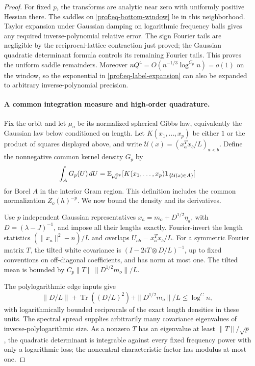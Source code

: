 \begin{proof}
For fixed \(p\), the transforms are analytic near zero with uniformly
positive Hessian there.  The saddles on
\eqref{prof:eq-bottom-window} lie in this neighborhood.  Taylor
expansion under Gaussian damping on logarithmic frequency balls gives
any required inverse-polynomial relative error.  The sign Fourier
tails are negligible by the reciprocal-lattice contraction just
proved; the Gaussian quadratic determinant formula controls its
remaining Fourier tails.  This proves the uniform saddle remainders.
Moreover \(nQ^4=O(n^{-1/3}\log^{C_p}n)=o(1)\) on the window, so
the exponential in \eqref{prof:eq-label-expansion} can also be
expanded to arbitrary inverse-polynomial precision.

\paragraph{A common integration measure and high-order quadrature.}
Fix the orbit and let \(\mu_o\) be its normalized spherical Gibbs
law, equivalently the Gaussian law below conditioned on length.
Let \(K(x_1,\ldots,x_p)\) be either \(1\) or the product of
squares displayed above, and write
\(\mathcal U(x)=(x_a^Tx_b/L)_{a<b}\). Define the nonnegative
common kernel density \(G_p\) by
\[
 \int_A G_p(U)\,dU
 =\mathbb E_{\mu_o^{\otimes p}}
       [K(x_1,\ldots,x_p)\mathbf1_{\{\mathcal U(x)\in A\}}]
\]
for Borel \(A\) in the interior Gram region. This definition
includes the common normalization \(Z_o(h)^{-p}\). We now bound
the density and its derivatives.

Use \(p\) independent Gaussian representatives
\(x_a=m_o+D^{1/2}\eta_a\), with \(D=(\lambda-J)^{-1}\), and impose
all their lengths exactly.  Fourier-invert the length statistics
\((\|x_a\|^2-n)/L\) and overlaps \(U_{ab}=x_a^Tx_b/L\).
For a symmetric Fourier matrix \(T\), the tilted white covariance is
\((I-2iT\otimes D/L)^{-1}\), up to fixed conventions on off-diagonal
coefficients, and has norm at most one.  The tilted mean is bounded
by \(C_p\|T\|\|D^{1/2}m_o\|/L\).

The polylogarithmic edge inputs give
\[
 \|D/L\|+\operatorname{Tr}((D/L)^2)
              +\|D^{1/2}m_o\|/L\le\log^C n,
\]
with logarithmically bounded reciprocals of the exact length densities
in these units.  The spectral spread supplies arbitrarily many
covariance eigenvalues of inverse-polylogarithmic size.  As a
nonzero \(T\) has an eigenvalue at least \(\|T\|/\sqrt p\), the
quadratic determinant is integrable against every fixed frequency
power with only a logarithmic loss; the noncentral characteristic
factor has modulus at most one.


\end{proof}
